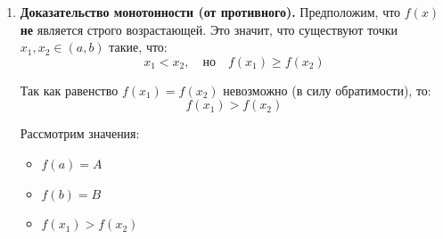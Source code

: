 \begin{tcolorbox}[title=Доказательство, breakable]
\begin{enumerate}
\begin{center}
\end{center}

        Предположим, что $\exists y_0 = f(x_0)$ такой, что $y_0 \notin [A, B]$.
        Например, $y_0 < A$.
        Тогда имеем: $f(x_0) < f(a) < f(b)$.
        По теореме о промежуточном значении на отрезке $[x_0, b]$ функция должна принять значение $f(a)$ (так как оно лежит между $f(x_0)$ и $f(b)$).
        То есть $\exists c \in (x_0, b): f(c) = f(a)$.
        Но $c \neq a$, так как $c > x_0 \ge a$.
        Получили $f(c) = f(a)$, что противоречит однозначной обратимости.
        \textbf{Вывод:} $f([a, b]) = [A, B]$.

        \item \textbf{Доказательство монотонности (от противного).}
        Предположим, что $f(x)$ \textbf{не} является строго возрастающей.
        Это значит, что существуют точки $x_1, x_2 \in (a, b)$ такие, что:
        \[ x_1 < x_2, \quad \text{но} \quad f(x_1) \ge f(x_2) \]
        
        Так как равенство $f(x_1) = f(x_2)$ невозможно (в силу обратимости), то:
        \[ f(x_1) > f(x_2) \]
        
        Рассмотрим значения:
        \begin{itemize}
            \item $f(a) = A$
            \item $f(b) = B$
            \item $f(x_1) > f(x_2)$
        \end{itemize}
        

\end{enumerate}
\end{tcolorbox}
